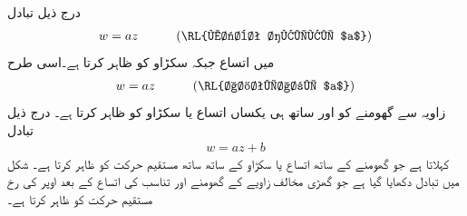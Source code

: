 درج ذیل تبادل
\begin{align*}
w=az \quad \quad \quad (\text{\RL{مثبت حقیقی $a$}})
\end{align*}
میں  اتساع جبکہ  سکڑاو کو ظاہر کرتا ہے۔اسی طرح 
\begin{align}
w=az\quad \quad \quad (\text{\RL{اختیاری $a$}})
\end{align}
زاویہ  سے گھومنے کو اور ساتھ ہی یکساں اتساع یا سکڑاو کو ظاہر کرتا ہے۔ درج ذیل تبادل
\begin{align}
w=az+b
\end{align}
 کہلاتا ہے جو گھومنے کے ساتھ اتساع یا سکڑاو  کے ساتھ ساتھ مستقیم حرکت  کو ظاہر کرتا ہے۔ شکل  میں  تبادل دکھایا گیا ہے جو گھڑی مخالف   زاویے کے گھومنے اور  تناسب کی اتساع کے بعد اوپر کی رخ مستقیم حرکت کو ظاہر کرتا ہے۔  
